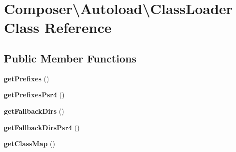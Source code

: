 \hypertarget{classComposer_1_1Autoload_1_1ClassLoader}{}\section{Composer\textbackslash{}Autoload\textbackslash{}Class\+Loader Class Reference}
\label{classComposer_1_1Autoload_1_1ClassLoader}
\subsection*{Public Member Functions}
\begin{DoxyCompactItemize}
\item 
{\bfseries get\+Prefixes} ()\hypertarget{classComposer_1_1Autoload_1_1ClassLoader_af3d914a2e97ec1118f3d70e5a0ce6435}{}\label{classComposer_1_1Autoload_1_1ClassLoader_af3d914a2e97ec1118f3d70e5a0ce6435}

\item 
{\bfseries get\+Prefixes\+Psr4} ()\hypertarget{classComposer_1_1Autoload_1_1ClassLoader_a36833139effe6653454d8f02ea8f555b}{}\label{classComposer_1_1Autoload_1_1ClassLoader_a36833139effe6653454d8f02ea8f555b}

\item 
{\bfseries get\+Fallback\+Dirs} ()\hypertarget{classComposer_1_1Autoload_1_1ClassLoader_a9fe425ce19f8e1298cefbf5094b3c402}{}\label{classComposer_1_1Autoload_1_1ClassLoader_a9fe425ce19f8e1298cefbf5094b3c402}

\item 
{\bfseries get\+Fallback\+Dirs\+Psr4} ()\hypertarget{classComposer_1_1Autoload_1_1ClassLoader_a149bf4470ee7c50bd6b9a84b6aa4bccd}{}\label{classComposer_1_1Autoload_1_1ClassLoader_a149bf4470ee7c50bd6b9a84b6aa4bccd}

\item 
{\bfseries get\+Class\+Map} ()\hypertarget{classComposer_1_1Autoload_1_1ClassLoader_aa7d3012e1f8299ecc6c3ff3cb3f2652e}{}\label{classComposer_1_1Autoload_1_1ClassLoader_aa7d3012e1f8299ecc6c3ff3cb3f2652e}


\end{DoxyCompactItemize}
